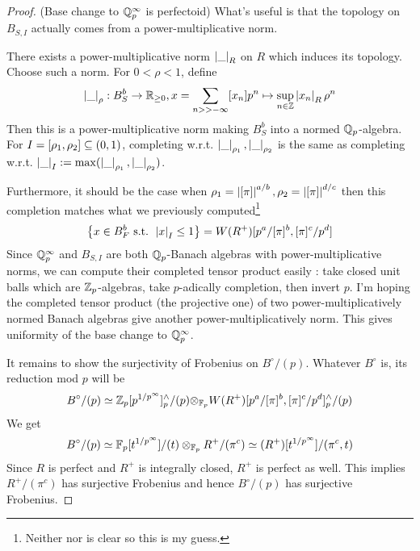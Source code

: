\documentclass{article}
\begin{document}
\begin{proof}
  (Base change to $\mathbb{Q}_p^\infty$ is perfectoid)
  What's useful is that 
  the topology on $B_{S , I}$ actually comes from a power-multiplicative norm.
  \begin{lem}
    
    There exists a power-multiplicative norm $\left\vert \_ \right\vert_R$ on $R$
    which induces its topology.
    Choose such a norm.
    For $0 < \rho < 1$,
    define \[
    \left\vert \_ \right\vert_\rho : B^b_{S} \to \mathbb{R}_{\geq 0} , 
    x = \sum_{n >> -\infty} [x_n] p^n 
    \mapsto \sup_{n \in \mathbb{Z}} \left\vert x_n \right\vert_R \rho^n
    \]
    Then this is a power-multiplicative norm
    making $B^b_S$ into a normed $\mathbb{Q}_p$-algebra.
    For $I = [\rho_1 , \rho_2] \subseteq (0,1)$,
    completing w.r.t. $\left\vert \_ \right\vert_{\rho_1} , \left\vert \_ \right\vert_{\rho_2}$
    is the same as completing w.r.t.
    $\left\vert \_ \right\vert_I := \max(\left\vert \_ \right\vert_{\rho_1} , \left\vert \_ \right\vert_{\rho_2})$.
    \cite[Section 7.1.1]{Far24}
  \end{lem}
  Furthermore, it should be the case
  when $\rho_1 = \left\vert [\pi] \right\vert^{a / b} , \rho_2 = \left\vert [\pi] \right\vert^{d / c}$
  then this completion matches what we previously computed\footnote{
    Neither \cite[Section 5.1]{KL15} nor \cite[Prop. II.1.1]{FS24}
    is clear so this is my guess.
  }
  \begin{align*}
    \left\{x \in B^b_F \text{ s.t. } \left\vert x \right\vert_I \leq 1\right\} = 
    W(R^+)[p^a / [\pi]^b , [\pi]^c / p^d]\\
  \end{align*}
  Since $\mathbb{Q}_p^\infty$ and $B_{S , I}$ are both 
  $\mathbb{Q}_p$-Banach algebras with power-multiplicative norms,
  we can compute their completed tensor product easily : 
  take closed unit balls which are $\mathbb{Z}_p$-algebras,
  take $p$-adically completion, then invert $p$.
  I'm hoping the completed tensor product (the projective one) of
  two power-multiplicatively normed Banach algebras
  give another power-multiplicatively norm.
  This gives uniformity of the base change to $\mathbb{Q}_p^\infty$.

  It remains to show the surjectivity of Frobenius on $B^\circ / (p)$.
  Whatever $B^\circ$ is,
  its reduction mod $p$ will be \[
    B^\circ / (p) \simeq 
    \mathbb{Z}_p[p^{1/p^\infty}]^\wedge_p / (p) {\otimes}_{\mathbb{F}_p}
    W(R^+)[p^a / [\pi]^b , [\pi]^c / p^d]^\wedge_p / (p)
  \]
  We get \[
    B^\circ / (p) \simeq \mathbb{F}_p[t^{1 / p^\infty}] / (t) \otimes_{\mathbb{F}_p}
      R^+ / (\pi^c)
      \simeq (R^+)[t^{1 / p^\infty}] / (\pi^c , t) 
  \]
  Since $R$ is perfect and $R^+$ is integrally closed,
  $R^+$ is perfect as well.
  This implies $R^+ / (\pi^c)$ has surjective Frobenius
  and hence $B^\circ / (p)$ has surjective Frobenius.


\end{proof}
\end{document}
